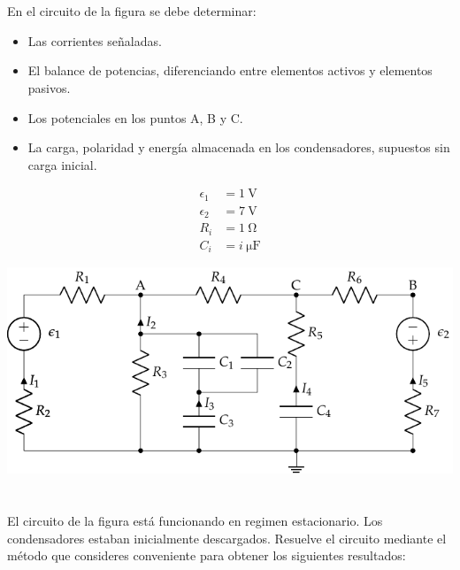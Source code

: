 \documentclass[10pt]{article}
\begin{document}
\clearpage

\section{}

En el circuito de la figura se debe determinar:
\begin{itemize}
\item Las corrientes señaladas.
\item El balance de potencias, diferenciando entre elementos activos y elementos pasivos.
\item Los potenciales en los puntos A, B y C.
\item La carga, polaridad y energía almacenada en los condensadores, supuestos sin carga inicial.
\end{itemize}

\begin{minipage}[c]{0.3\linewidth}
  \begin{align*}
    \epsilon_1&=\SI{1}{\volt}\\
    \epsilon_2&=\SI{7}{\volt}\\
    R_i &= \SI{1}{\ohm}\\
    C_i &= \SI{i}{\micro\farad}
  \end{align*}
\end{minipage}
\begin{minipage}[c]{0.7\linewidth}
  \includegraphics{figs/mallas_agrupacion_condensadores.pdf}
\end{minipage}

\clearpage

\section{}

El circuito de la figura está funcionando en regimen estacionario. Los condensadores estaban inicialmente descargados. Resuelve el circuito mediante el método que consideres conveniente para obtener los siguientes resultados:
\end{document}
